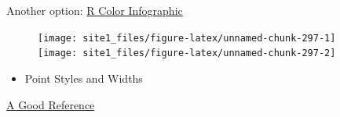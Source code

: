 \documentclass[]{book}
\newenvironment{Shaded}{\begin{snugshade}}{\end{snugshade}}
\newcommand{\KeywordTok}[1]{\textcolor[rgb]{0.13,0.29,0.53}{\textbf{#1}}}
\newcommand{\DataTypeTok}[1]{\textcolor[rgb]{0.13,0.29,0.53}{#1}}
\newcommand{\DecValTok}[1]{\textcolor[rgb]{0.00,0.00,0.81}{#1}}
\newcommand{\StringTok}[1]{\textcolor[rgb]{0.31,0.60,0.02}{#1}}
\newcommand{\CommentTok}[1]{\textcolor[rgb]{0.56,0.35,0.01}{\textit{#1}}}
\newcommand{\OperatorTok}[1]{\textcolor[rgb]{0.81,0.36,0.00}{\textbf{#1}}}
\newcommand{\NormalTok}[1]{#1}
\providecommand{\tightlist}{%
  \setlength{\itemsep}{0pt}\setlength{\parskip}{0pt}}
\begin{document}
Another option:
\href{http://research.stowers-institute.org/efg/R/Color/Chart/ColorsChart1.jpg}{R
Color Infographic}

\begin{Shaded}
\end{Shaded}

\begin{figure}

{\centering \texttt{[image: site1\_files/figure-latex/unnamed-chunk-297-1]} \texttt{[image: site1\_files/figure-latex/unnamed-chunk-297-2]} 

}

\caption{ }\label{fig:unnamed-chunk-297}
\end{figure}

\begin{itemize}
\tightlist
\item
  Point Styles and Widths
\end{itemize}

\href{http://www.endmemo.com/program/R/pic/pchsymbols.png}{A Good
Reference}
\end{document}
